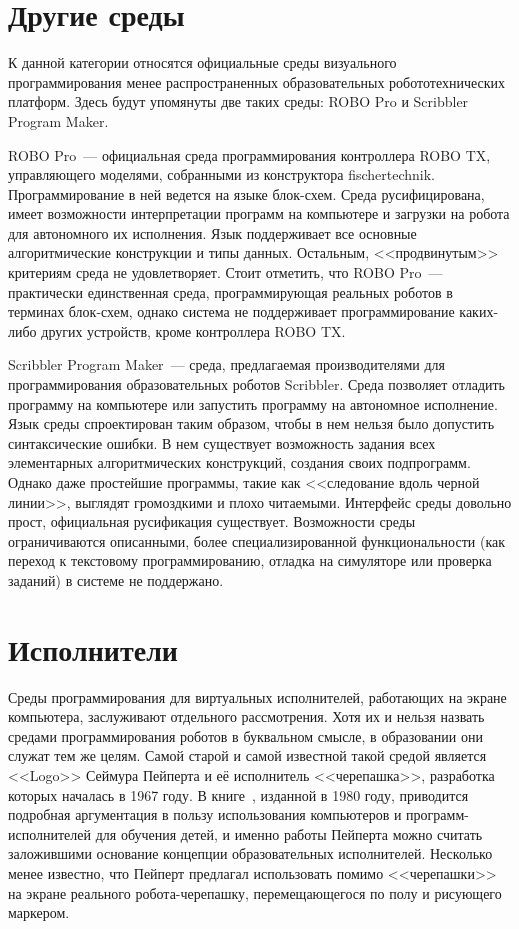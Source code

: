 \documentclass[a5paper]{article}
\begin{document}
\section{Другие среды}

К данной категории относятся официальные среды визуального программирования менее распространенных образовательных 
робототехнических платформ. Здесь будут упомянуты две таких среды: ROBO Pro и Scribbler Program Maker.

ROBO Pro~--- официальная среда программирования контроллера ROBO TX, управляющего моделями, собранными из 
конструктора fischertechnik. Программирование в ней ведется на языке блок-схем. Среда русифицирована, имеет 
возможности интерпретации программ на компьютере и загрузки на робота для автономного их исполнения. Язык поддерживает 
все основные алгоритмические конструкции и типы данных. Остальным, <<продвинутым>> критериям среда не удовлетворяет. 
Стоит отметить, что ROBO Pro~--- практически единственная среда, программирующая реальных роботов в терминах 
блок-схем, однако система не поддерживает программирование каких-либо других устройств, кроме контроллера ROBO TX.

Scribbler Program Maker~--- среда, предлагаемая производителями для программирования образовательных роботов 
Scribbler. Среда позволяет отладить программу на компьютере или запустить программу на автономное исполнение. 
Язык среды спроектирован таким образом, чтобы в нем нельзя было допустить синтаксические ошибки. В нем существует 
возможность задания всех элементарных алгоритмических конструкций, создания своих подпрограмм. Однако даже простейшие 
программы, такие как <<следование вдоль черной линии>>, выглядят громоздкими и плохо читаемыми. Интерфейс среды 
довольно прост, официальная русификация существует. Возможности среды ограничиваются 
описанными, более специализированной функциональности (как переход к текстовому программированию, отладка на 
симуляторе или проверка заданий) в системе не поддержано.

\section{Исполнители}

Среды программирования для виртуальных исполнителей, работающих на экране компьютера, заслуживают отдельного 
рассмотрения. Хотя их и нельзя назвать средами программирования роботов в буквальном смысле, в образовании 
они служат тем же целям. Самой старой и самой известной такой средой является <<Logo>> Сеймура Пейперта и 
её исполнитель <<черепашка>>, разработка которых началась в 1967 году. В книге~\cite{papert1980mindstorms}, 
изданной в 1980 году, приводится подробная аргументация в пользу использования компьютеров и 
программ-исполнителей для обучения детей, и именно работы Пейперта можно считать заложившими 
основание концепции образовательных исполнителей. Несколько менее известно, что Пейперт предлагал 
использовать помимо <<черепашки>> на экране реального робота-черепашку, 
перемещающегося по полу и рисующего маркером.
\end{document}
